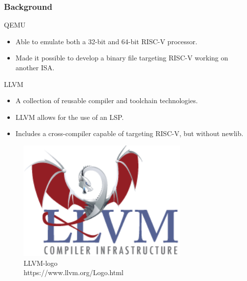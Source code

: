 \begin{frame}[hoved]
  \frametitle{Background}
  \begin{minipage}{0.45\textwidth}
  {\large QEMU}
  \begin{itemize}
    \item Able to emulate both a 32-bit and 64-bit RISC-V processor.
    \item Made it possible to develop a binary file targeting RISC-V working on
      another ISA.
  \end{itemize}
  \vspace{0.5em}
  {\large LLVM}
  \begin{itemize}
    \item A collection of reusable compiler and toolchain technologies.
    \item LLVM allows for the use of an LSP.
    \item Includes a cross-compiler capable of targeting RISC-V, but without
      newlib.
  \end{itemize}
\end{minipage}
\hfill
\begin{minipage}{0.45\textwidth}
  \begin{figure}
    \begin{center}
      \includegraphics[width=0.75\textwidth]{figures/LLVM-logo.png}
    \end{center}
    \caption{LLVM-logo \\
    \tiny https://www.llvm.org/Logo.html}\label{fig:llvm-logo}
  \end{figure}
\end{minipage}
\end{frame}

